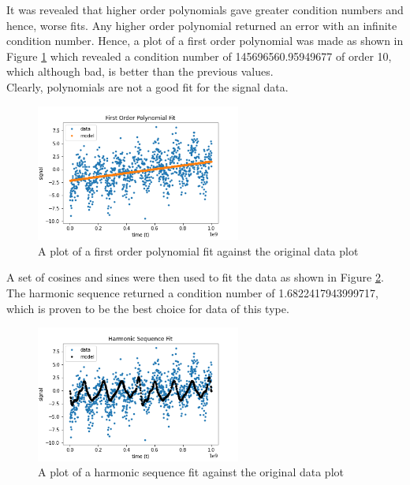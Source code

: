 \documentclass[11pt]{article}
\begin{document}
It was revealed that higher order polynomials gave greater condition numbers and hence, worse fits. Any higher order polynomial returned an error with an infinite condition number. Hence, a plot of a first order polynomial was made as shown in Figure \ref{fig:first order polynomial fit} which revealed a condition number of 145696560.95949677 of order 10, which although bad, is better than the previous values. 
\\
Clearly, polynomials are not a good fit for the signal data.\\

\begin{figure}[htp]\begin{center} 
		\vspace{12pt}
		\includegraphics[width=0.6\textwidth]{first order Polynomial.png}
		\caption{A plot of a first order polynomial fit against the original data plot  }
		\label{fig:first order polynomial fit} 
	\end{center}
\end{figure} 


A set of cosines and sines were then used to fit the data as shown in Figure \ref{fig:harmonic sequence fit}. The harmonic sequence returned a condition number of 1.6822417943999717, which is proven to be the best choice for data of this type.

\begin{figure}[htp]\begin{center} 
		\vspace{12pt}
		\includegraphics[width=0.6\textwidth]{harmonic sequence fit.png}
		\caption{A plot of a harmonic sequence fit against the original data plot  }
		\label{fig:harmonic sequence fit} 
	\end{center}
\end{figure} 
\end{document}
